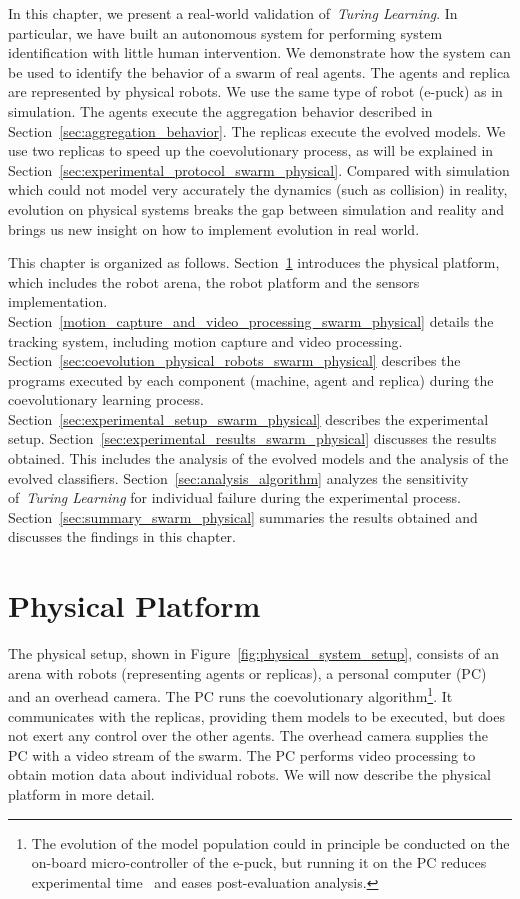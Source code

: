 In this chapter, we present a real-world validation of~\textit{Turing Learning}. In particular, we have built an autonomous system for performing system identification with little human intervention. We demonstrate how the system can be used to identify the behavior of a swarm of real agents. The agents and replica are represented by physical robots. We use the same type of robot (e-puck) as in simulation. The agents execute the aggregation behavior described in Section~\ref{sec:aggregation_behavior}. The replicas execute the evolved models. We use two replicas to speed up the coevolutionary process, as will be explained in Section~\ref{sec:experimental_protocol_swarm_physical}. Compared with simulation which  could not model very accurately the dynamics (such as collision) in reality, evolution on physical systems breaks the gap between simulation and reality and brings us new insight on how to implement evolution in real world. 

This chapter is organized as follows. Section~\ref{sec:experimental_platform_swarm_physical} introduces the physical platform, which includes the robot arena, the robot platform and the sensors implementation. Section~\ref{motion_capture_and_video_processing_swarm_physical} details the tracking system, including motion capture and video processing. Section~\ref{sec:coevolution_physical_robots_swarm_physical} describes the programs executed by each component (machine, agent and replica) during the coevolutionary learning process. Section~\ref{sec:experimental_setup_swarm_physical} describes the experimental setup. Section~\ref{sec:experimental_results_swarm_physical} discusses the results obtained. This includes the analysis of the evolved models and the analysis of the evolved classifiers. Section~\ref{sec:analysis_algorithm} analyzes the sensitivity of~\textit{Turing Learning} for individual failure during the experimental process. Section~\ref{sec:summary_swarm_physical} summaries the results obtained and discusses the findings in this chapter.

\section{Physical Platform}\label{sec:experimental_platform_swarm_physical}

The physical setup, shown in Figure~\ref{fig:physical_system_setup}, consists of an arena with robots (representing agents or replicas), a personal computer (PC) and an overhead camera. The PC runs the coevolutionary algorithm\footnote{The evolution of the model population could in principle be conducted on the on-board micro-controller of the e-puck, but running it on the PC reduces experimental time~\cite{Floreano1996} and eases post-evaluation analysis.}. It communicates with the replicas, providing them models to be executed, but does not exert any control over the other agents. The overhead camera supplies the PC with a video stream of the swarm. The PC performs video processing to obtain motion data about individual robots. We will now describe the physical platform in more detail.

